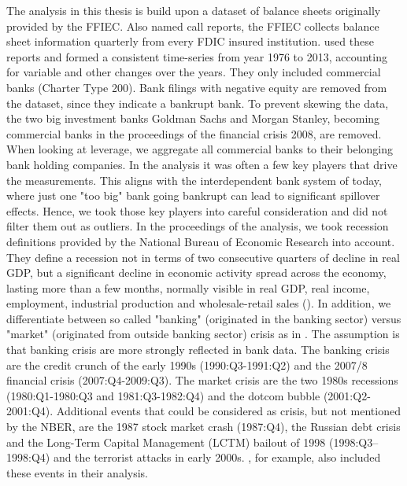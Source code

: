 \documentclass[12pt, a4paper]{article} %
\begin{document}
The analysis in this thesis is build upon a dataset of balance sheets originally provided by the FFIEC. Also named call reports, the FFIEC collects balance sheet information quarterly from every FDIC insured institution. \citet{DrechslerSchnabel2017} used these reports and formed a consistent time-series from year 1976 to 2013, accounting for variable and other changes over the years. They only included commercial banks (Charter Type 200).
Bank filings with negative equity are removed from the dataset, since they indicate a bankrupt bank. To prevent skewing the data, the two big investment banks Goldman Sachs and Morgan Stanley, becoming commercial banks in the proceedings of the financial crisis 2008, are removed. When looking at leverage, we aggregate all commercial banks to their belonging bank holding companies. %
In the analysis it was often a few key players that drive the measurements. This aligns with the interdependent bank system of today, where just one "too big" bank going bankrupt can lead to significant spillover effects. Hence, we took those key players into careful consideration and did not filter them out as outliers. 
In the proceedings of the analysis, we took recession definitions provided by the National Bureau of Economic Research into account. They define a recession not in terms of two consecutive quarters of decline in real GDP, but a significant decline in economic activity spread across the economy, lasting more than a few months, normally visible in real GDP, real income, employment, industrial production and wholesale-retail sales (\citet{NBERBusinessCycles}). In addition, we differentiate between so called "banking" (originated in the banking sector) versus "market" (originated from outside banking sector) crisis as in \citet{BergerBouwman2013}. The assumption is that banking crisis are more strongly reflected in bank data.
The banking crisis are the credit crunch of the early 1990s (1990:Q3-1991:Q2) and the 2007/8 financial crisis (2007:Q4-2009:Q3). The market crisis are the two 1980s recessions (1980:Q1-1980:Q3 and 1981:Q3-1982:Q4) and the dotcom bubble (2001:Q2-2001:Q4). Additional events that could be considered as crisis, but not mentioned by the NBER, are the 1987 stock market crash (1987:Q4), the Russian debt crisis and the Long-Term Capital Management (LCTM) bailout of 1998 (1998:Q3–1998:Q4) and the terrorist attacks in early 2000s. \citet{BergerBouwman2013}, for example, also included these events in their analysis.
\end{document}
